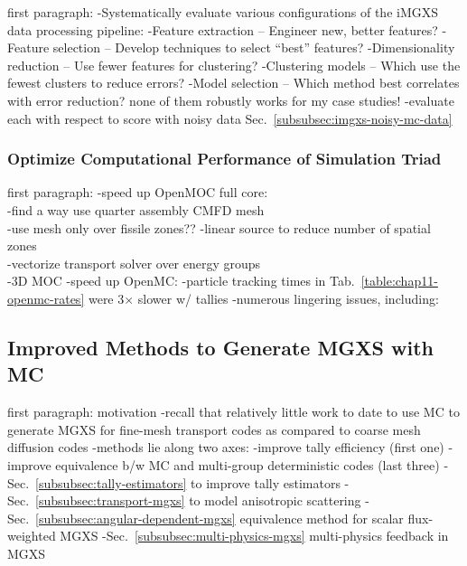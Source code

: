 first paragraph: 
-Systematically evaluate various configurations of the iMGXS data processing pipeline:
-Feature extraction – Engineer new, better features?
-Feature selection – Develop techniques to select “best” features?
-Dimensionality reduction – Use fewer features for clustering?
-Clustering models – Which use the fewest clusters to reduce errors?
-Model selection – Which method best correlates with error reduction? none of them robustly works for my case studies!
-evaluate each with respect to score with noisy data Sec.~\ref{subsubsec:imgxs-noisy-mc-data}

\subsubsection{Optimize Computational Performance of Simulation Triad}
\label{subsubsec:chap12-optimize-simulation-triad}

first paragraph:
-speed up OpenMOC full core: \\
  -find a way use quarter assembly CMFD mesh \\
    -use mesh only over fissile zones??
  -linear source to reduce number of spatial zones \\
  -vectorize transport solver over energy groups \\
  -3D \ac{MOC}
-speed up OpenMC:
  -particle tracking times in Tab.~\ref{table:chap11-openmc-rates} were 3$\times$ slower w/ tallies
  -numerous lingering issues, including: 

\subsection{Improved Methods to Generate MGXS with MC}
\label{subsec:chap12-improve-mc-methods}

first paragraph: motivation
-recall that relatively little work to date to use \ac{MC} to generate \ac{MGXS} for fine-mesh transport codes as compared to coarse mesh diffusion codes
-methods lie along two axes:
  -improve tally efficiency (first one)
  -improve equivalence b/w \ac{MC} and multi-group deterministic codes (last three)
-Sec.~\ref{subsubsec:tally-estimators} to improve tally estimators
-Sec.~\ref{subsubsec:transport-mgxs} to model anisotropic scattering
-Sec.~\ref{subsubsec:angular-dependent-mgxs} equivalence method for scalar flux-weighted \ac{MGXS}
-Sec.~\ref{subsubsec:multi-physics-mgxs} multi-physics feedback in \ac{MGXS}

